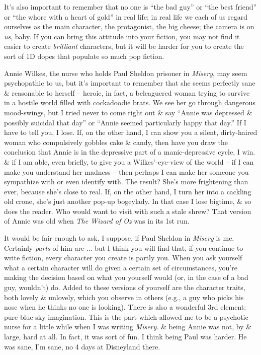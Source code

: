 \documentclass{article}
\numberwithin{equation}{section}
\begin{document}
It's also important to remember that no one is ``the bad guy'' or ``the best friend'' or ``the whore with a heart of gold'' in real life; in real life we each of us regard ourselves as the main character, the protagonist, the big cheese; the camera is on \textit{us}, baby. If you can bring this attitude into your fiction, you may not find it easier to create \textit{brilliant} characters, but it will be harder for you to create the sort of 1D dopes that populate so much pop fiction.

Annie Wilkes, the nurse who holds Paul Sheldon prisoner in \textit{Misery}, may seem psychopathic to us, but it's important to remember that she seems perfectly sane \& reasonable to herself -- heroic, in fact, a beleaguered woman trying to survive in a hostile world filled with cockadoodie brats. We see her go through dangerous mood-swings, but I tried never to come right out \& say ``Annie was depressed \& possibly suicidal that day'' or ``Annie seemed particularly happy that day.'' If I have to tell you, I lose. If, on the other hand, I can show you a silent, dirty-haired woman who compulsively gobbles cake \& candy, then have you draw the conclusion that Annie is in the depressive part of a manic-depressive cycle, I win. \& if I am able, even briefly, to give you a Wilkes'-eye-view of the world -- if I can make you understand her madness -- then perhaps I can make her someone you sympathize with or even identify with. The result? She's more frightening than ever, because she's close to real. If, on the other hand, I turn her into a cackling old crone, she's just another pop-up bogeylady. In that case I lose bigtime, \& so does the reader. Who would want to visit with such a stale shrew? That version of Annie was old when \textit{The Wizard of Oz} was in its 1st run.

It would be fair enough to ask, I suppose, if Paul Sheldon in \textit{Misery} is me. Certainly \textit{parts} of him are $\ldots$ but I think you will find that, if you continue to write fiction, every character you create is partly you. When you ask yourself what a certain character will do given a certain set of circumstances, you're making the decision based on what you yourself would (or, in the case of a bad guy, wouldn't) do. Added to these versions of yourself are the character traits, both lovely \& unlovely, which you observe in others (e.g., a guy who picks his nose when he thinks no one is looking). There is also a wonderful 3rd element: pure blue-sky imagination. This is the part which allowed me to be a psychotic nurse for a little while when I was writing \textit{Misery}. \& being Annie was not, by \& large, hard at all. In fact, it was sort of fun. I think being Paul was harder. He was sane, I'm sane, no 4 days at Disneyland there.
\end{document}
